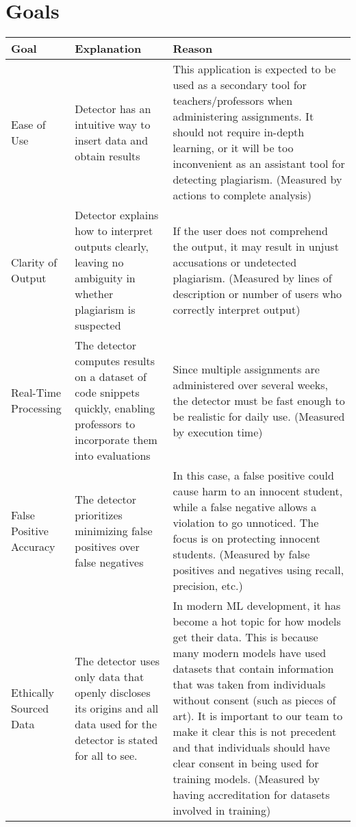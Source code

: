 \documentclass{article}
\begin{document}

\section{Goals}

\begin{center}
\hspace*{-1cm}
\begin{tabular}{ | p{3cm} | p{6cm} | p{6cm} | }
\hline
Goal & Explanation & Reason \\
\hline
Ease of Use & Detector has an intuitive way to insert data and obtain results &
This application is expected to be used as a secondary tool for
teachers/professors when administering assignments. It should not require
in-depth learning, or it will be too inconvenient as an assistant tool for
detecting plagiarism. (Measured by actions to complete analysis)\\
\hline
Clarity of Output & Detector explains how to interpret outputs clearly, leaving
no ambiguity in whether plagiarism is suspected & If the user does not
comprehend the output, it may result in unjust accusations or undetected
plagiarism. (Measured by lines of description or number of users who correctly
interpret output)\\
\hline
Real-Time Processing & The detector computes results on a dataset of code
snippets quickly, enabling professors to incorporate them into evaluations &
Since multiple assignments are administered over several weeks, the detector
must be fast enough to be realistic for daily use. (Measured by execution
time)\\
\hline
False Positive Accuracy & The detector prioritizes minimizing false positives over
false negatives & In this case, a false positive could cause harm to an innocent
student, while a false negative allows a violation to go unnoticed. The focus is
on protecting innocent students. (Measured by false positives and negatives
using recall, precision, etc.)\\
\hline
Ethically Sourced Data & The detector uses only data that openly discloses its 
origins and all data used for the detector is stated for all to see. & In 
modern ML development, it has become a hot topic for how models get their data.
This is because many modern models have used datasets that contain information
that was taken from individuals without consent (such as pieces of art). It is
important to our team to make it clear this is not precedent and that 
individuals should have clear consent in being used for training models. 
(Measured by having accreditation for datasets involved in training)\\
\hline
\end{tabular}
\end{center}
\end{document}
